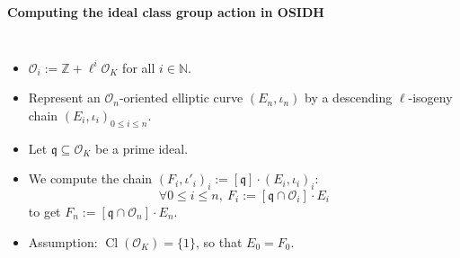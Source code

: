 \documentclass[10pt]{beamer}
\theoremstyle{plain}
\theoremstyle{definition}
\newcommand{\N}{\mathbb{N}}
\newcommand{\Z}{\mathbb{Z}}
\newcommand{\mO}{\mathcal{O}}
\renewcommand{\(}{\left(}
\renewcommand{\)}{\right)}
\newcommand{\mf}[1]{\mathfrak{#1}}
\newcommand{\mfq}{\mathfrak{q}}
\DeclareMathOperator{\Cl}{Cl}
\begin{document}
\begin{frame}
\textbf{Computing the ideal class group action in OSIDH}

\begin{columns}[t]

\begin{itemize}
\item $\mO_i:=\Z+\ell^i\mO_K$ for all $i\in\N$.
\item Represent an $\mO_n$-oriented elliptic curve $(E_n,\iota_n)$ by a descending $\ell$-isogeny chain $(E_i,\iota_i)_{0\leq i\leq n}$.
\item Let $\mfq\subseteq \mO_K$ be a prime ideal.
\item We compute the chain $(F_i,\iota'_i)_i:=[\mf{q}]\cdot (E_i,\iota_i)_i$:
\[\forall 0\leq i\leq n, \ F_i:=[\mf{q}\cap\mO_i]\cdot E_i\]
to get $F_n:=[\mf{q}\cap\mO_n]\cdot E_n$.
\item Assumption: $\Cl(\mO_K)=\{1\}$, so that $E_0=F_0$.

\end{itemize}





\end{columns}
\end{frame}
\end{document}
